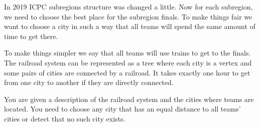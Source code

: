 In 2019 ICPC subregions structure was changed a little. Now for each subregion, we need to choose the best place for the subregion finals. To make things fair we want to choose a city in such a way that all teams will spend the same amount of time to get there.

To make things simpler we say that all teams will use trains to get to the finals. The railroad system can be represented as a tree where each city is a vertex and some pairs of cities are connected by a railroad. It takes exactly one hour to get from one city to another if they are directly connected. 

You are given a description of the railroad system and the cities where teams are located. You need to choose any city that has an equal distance to all teams' cities or detect that no such city exists.